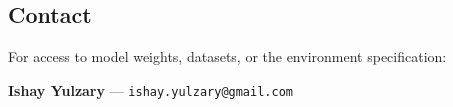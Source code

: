 \documentclass[12pt,a4paper]{article}
\begin{document}
\subsection{Contact}
\label{sec:ug-contact}

For access to model weights, datasets, or the environment specification:

\medskip
\noindent\textbf{Ishay Yulzary} --- \texttt{ishay.yulzary@gmail.com}

\end{document}
